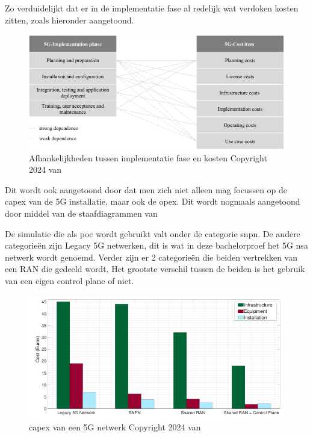 Zo verduidelijkt \textcite{Abbas2024} dat er in de implementatie fase al redelijk wat verdoken kosten zitten, zoals hieronder aangetoond.
\begin{figure}[H]
  \includegraphics[width=\linewidth]{../graphics/kost-associaties.png}
  \caption{Afhankelijkheden tussen implementatie fase en kosten \autocite[Door][]{Abbas2024} Copyright 2024 van \textcite{Abbas2024}}
  \label{fig:Cost}
\end{figure}

Dit wordt ook aangetoond door \textcite{Hilary2024} dat men zich niet alleen mag focussen op de \gls{capex} van de 5G installatie, maar ook de \gls{opex}. Dit wordt nogmaals aangetoond door middel van de staafdiagrammen van \textcite{Hilary2024}

De simulatie die als \gls{poc} wordt gebruikt valt onder de categorie \gls{snpn}. De andere categorieën zijn Legacy 5G netwerken, dit is wat in deze bachelorproef het 5G \gls{nsa} netwerk wordt genoemd. Verder zijn er 2 categorieën die beiden vertrekken van een RAN die gedeeld wordt. Het grootste verschil tussen de beiden is het gebruik van een eigen control plane of niet.

\begin{figure}[H]
  \includegraphics[width=\linewidth]{../graphics/capex.png}
  \caption{\gls{capex} van een 5G netwerk \autocite[Door][]{Hilary2024} Copyright 2024 van \textcite{Hilary2024}}
  \label{fig:capex}
\end{figure}

